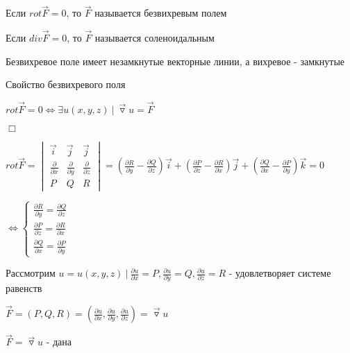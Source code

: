 \documentclass[12pt]{article}
\begin{document}
    \hypertarget{vectorfieldtypes}{}

     Если $rot \overrightarrow{F} = 0$, то $\overrightarrow{F}$ называется безвихревым полем

     Если $div \overrightarrow{F} = 0$, то $\overrightarrow{F}$ называется соленоидальным

    \Nota Безвихревое поле имеет незамкнутые векторные линии, а вихревое - замкнутые

    \hypertarget{irrotationalfieldproperty}{}

     Свойство безвихревого поля

    $rot \overrightarrow{F} = 0 \Longleftrightarrow \exists u(x, y, z) \ | \ \overrightarrow{\triangledown}u = \overrightarrow{F}$

    $\Box$ \fbox{\Longrightarrow}

    $rot \overrightarrow{F} =
    \begin{vmatrix}
        \overrightarrow{i}          & \overrightarrow{j}          & \overrightarrow{j}          \\
        \frac{\partial}{\partial x} & \frac{\partial}{\partial y} & \frac{\partial}{\partial z} \\
        P & Q & R
    \end{vmatrix} = \left(\frac{\partial R}{\partial y} - \frac{\partial Q}{\partial z}\right)\overrightarrow{i} + \left(\frac{\partial P}{\partial z} - \frac{\partial R}{\partial x}\right)\overrightarrow{j} + \left(\frac{\partial Q}{\partial x} - \frac{\partial P}{\partial y}\right)\overrightarrow{k} = 0$

    $\Longleftrightarrow
    \begin{cases}
        \frac{\partial R}{\partial y} = \frac{\partial Q}{\partial z} \\
        \frac{\partial P}{\partial z} = \frac{\partial R}{\partial x} \\
        \frac{\partial Q}{\partial x} = \frac{\partial P}{\partial y}
    \end{cases}$

    Рассмотрим $u = u(x, y, z) \ | \ \frac{\partial u}{\partial x} = P, \frac{\partial u}{\partial y} = Q, \frac{\partial u}{\partial z} = R$ - удовлетворяет системе равенств

    $\overrightarrow{F} = (P, Q, R) = \left(\frac{\partial u}{\partial x}, \frac{\partial u}{\partial y}, \frac{\partial u}{\partial z}\right) = \overrightarrow{\triangledown} u$

    \fbox{\Longleftarrow} $\overrightarrow{F} = \overrightarrow{\triangledown}u$ - дана
\end{document}
